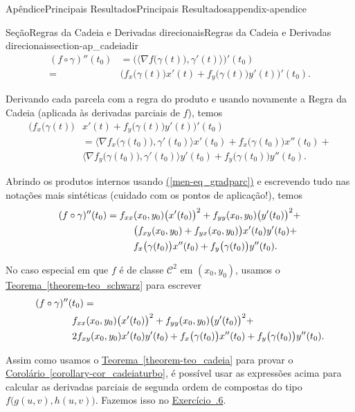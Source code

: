 \documentclass[oneside,10pt,]{book}
\newcommand{\xreffont}{\relax}
\numberwithin{equation}{section}
\begin{document}
\begin{appendixptx}{Apêndice}{Principais Resultados}{}{Principais Resultados}{}{}{appendix-apendice}
\begin{sectionptx}{Seção}{Regras da Cadeia e Derivadas direcionais}{}{Regras da Cadeia e Derivadas direcionais}{}{}{section-ap_cadeiadir}
\begin{align*}
(f\circ\gamma)''(t_0)&=\Big(\big\langle\nabla
f\big(\gamma(t)\big),\gamma'(t)\big\rangle\Big)'(t_0)\\
=&\Big(f_x\big(\gamma(t)\big)x'(t)+
f_y\big(\gamma(t)\big)y'(t)\Big)'(t_0).
\end{align*}
%
\par
Derivando cada parcela com a regra do produto e usando novamente a Regra da Cadeia (aplicada às derivadas parciais de \(f\)), temos%
\begin{align*}
\Big(f_x\big(\gamma(t)\big)&x'(t)+
f_y\big(\gamma(t)\big)y'(t)\Big)'(t_0)\\
&=\big\langle \nabla
f_x\big(\gamma(t_0)\big),\gamma'(t_0)\Big\rangle x'(t_0)+
f_x\big(\gamma(t_0)\big)x''(t_0)+\\
&\big\langle \nabla
f_y\big(\gamma(t_0)\big),\gamma'(t_0)\Big\rangle y'(t_0)+
f_y\big(\gamma(t_0)\big)y''(t_0).
\end{align*}
%
\par
Abrindo os produtos internos usando \hyperref[men-eq_gradparc]{({\xreffont\ref{men-eq_gradparc}})} e escrevendo tudo nas notações mais sintéticas (cuidado com os pontos de aplicação!), temos%
\begin{align}
(f\circ\gamma)''(t_0)
=f_{xx}&(x_0,y_0)\big(x'(t_0)\big)^2+f_{yy}(x_0,y_0)\big(y'(t_0)\big)^2+\notag\\
&\big(f_{xy}(x_0,y_0)+f_{yx}(x_0,y_0)\big)x'(t_0)y'(t_0)+\notag\\
&f_x\big(\gamma(t_0)\big)x''(t_0)+
f_y\big(\gamma(t_0)\big)y''(t_0).\label{mrow-eq_cadeiaderseg}
\end{align}
%
\par
No caso especial em que \(f\) é de classe \(\mathscr{C}^2\) em \((x_0,y_0)\), usamos o \hyperref[theorem-teo_schwarz]{Teorema~{\xreffont\ref{theorem-teo_schwarz}}} para escrever%
\begin{align}
(f\circ\gamma)''(&t_0)=\notag\\
&f_{xx}(x_0,y_0)\big(x'(t_0)\big)^2+f_{yy}(x_0,y_0)\big(y'(t_0)\big)^2+\notag\\
&2f_{xy}(x_0,y_0)x'(t_0)y'(t_0)+f_x\big(\gamma(t_0)\big)x''(t_0)+
f_y\big(\gamma(t_0)\big)y''(t_0).\label{mrow-eq_cadeiadersegc2}
\end{align}
%
\par
Assim como usamos o \hyperref[theorem-teo_cadeia]{Teorema~{\xreffont\ref{theorem-teo_cadeia}}} para provar o \hyperref[corollary-cor_cadeiaturbo]{Corolário~{\xreffont\ref{corollary-cor_cadeiaturbo}}}, é possível usar as expressões acima para calcular as derivadas parciais de segunda ordem de compostas do tipo \(f\big(g(u,v),h(u,v)\big)\). Fazemos isso no \hyperlink{exercise-cadeia6}{Exercício~{\xreffont 1.6.6}}.%

\end{sectionptx}
\end{appendixptx}
\end{document}
